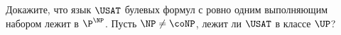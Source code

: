Докажите, что язык $\USAT$ булевых формул с ровно одним выполняющим набором лежит в $\P^{\NP}$. Пусть
$\NP \neq \coNP$, лежит ли $\USAT$ в классе $\UP$?
